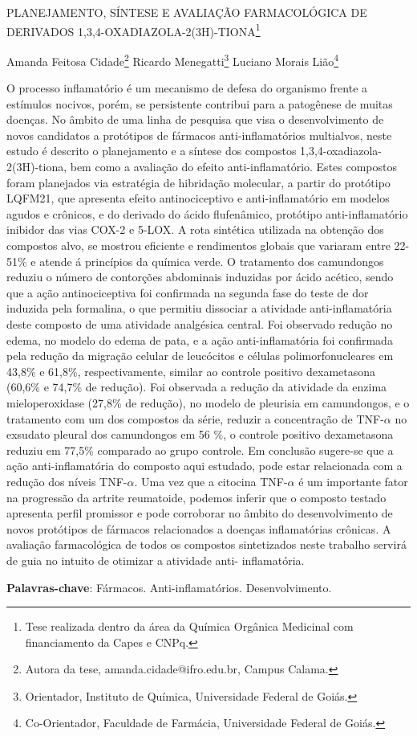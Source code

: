 \documentclass[article,12pt,onesidea,4paper,english,brazil]{abntex2}
\begin{document}
	
	
	\frenchspacing 
	
	\begin{center}
		\LARGE PLANEJAMENTO, SÍNTESE E AVALIAÇÃO FARMACOLÓGICA DE DERIVADOS 1,3,4-OXADIAZOLA-2(3H)-TIONA\footnote{Tese realizada dentro da área da Química Orgânica Medicinal com financiamento da Capes e CNPq.}
		
		\normalsize
		Amanda Feitosa Cidade\footnote{Autora da tese, amanda.cidade@ifro.edu.br, Campus Calama.} 
		Ricardo Menegatti\footnote{Orientador, Instituto de Química, Universidade Federal de Goiás.} 
		Luciano Morais Lião\footnote{Co-Orientador, Faculdade de Farmácia, Universidade Federal de Goiás.}
	\end{center}
	
	\noindent O processo inflamatório é um mecanismo de defesa do organismo frente a estímulos
	nocivos, porém, se persistente contribui para a patogênese de muitas doenças. No
	âmbito de uma linha de pesquisa que visa o desenvolvimento de novos candidatos a
	protótipos de fármacos anti-inflamatórios multialvos, neste estudo é descrito o
	planejamento e a síntese dos compostos 1,3,4-oxadiazola-2(3H)-tiona, bem como a
	avaliação do efeito anti-inflamatório. Estes compostos foram planejados via
	estratégia de hibridação molecular, a partir do protótipo LQFM21, que apresenta
	efeito antinociceptivo e anti-inflamatório em modelos agudos e crônicos, e do
	derivado do ácido flufenâmico, protótipo anti-inflamatório inibidor das vias COX-2 e
	5-LOX. A rota sintética utilizada na obtenção dos compostos alvo, se mostrou
	eficiente e rendimentos globais que variaram entre 22-51\% e atende á princípios da
	química verde. O tratamento dos camundongos reduziu o número de contorções
	abdominais induzidas por ácido acético, sendo que a ação antinociceptiva foi
	confirmada na segunda fase do teste de dor induzida pela formalina, o que permitiu
	dissociar a atividade anti-inflamatória deste composto de uma atividade analgésica
	central. Foi observado redução no edema, no modelo do edema de pata, e a ação
	anti-inflamatória foi confirmada pela redução da migração celular de leucócitos e
	células polimorfonucleares em 43,8\% e 61,8\%, respectivamente, similar ao controle
	positivo dexametasona (60,6\% e 74,7\% de redução). Foi observada a redução da
	atividade da enzima mieloperoxidase (27,8\% de redução), no modelo de pleurisia
	em camundongos, e o tratamento com um dos compostos da série, reduzir a
	concentração de TNF-$\alpha$ no exsudato pleural dos camundongos em 56 \%, o controle
	positivo dexametasona reduziu em 77,5\% comparado ao grupo controle. Em
	conclusão sugere-se que a ação anti-inflamatória do composto aqui estudado, pode
	estar relacionada com a redução dos níveis TNF-$\alpha$. Uma vez que a citocina TNF-$\alpha$ é
	um importante fator na progressão da artrite reumatoide, podemos inferir que o
	composto testado apresenta perfil promissor e pode corroborar no âmbito do
	desenvolvimento de novos protótipos de fármacos relacionados a doenças
	inflamatórias crônicas. A avaliação farmacológica de todos os compostos
	sintetizados neste trabalho servirá de guia no intuito de otimizar a atividade anti-
	inflamatória.
	
	\vspace{\onelineskip}
	
	\noindent
	\textbf{Palavras-chave}: Fármacos. Anti-inflamatórios. Desenvolvimento.
	
\end{document}
